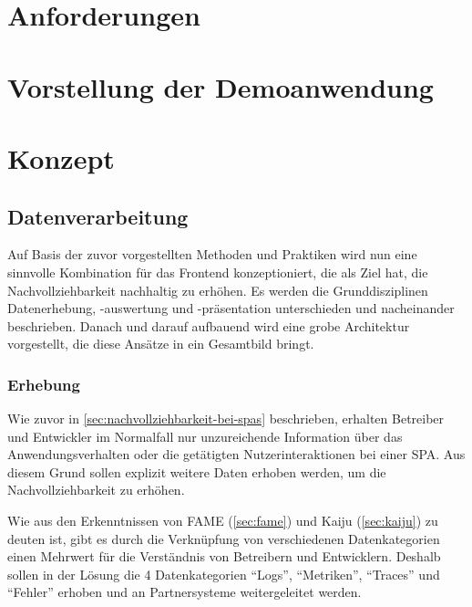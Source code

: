 	
\section{Anforderungen}

	
\section{Vorstellung der Demoanwendung}

	
\newpage
	
\section{Konzept}
	
	\subsection{Datenverarbeitung}

	Auf Basis der zuvor vorgestellten Methoden und Praktiken wird nun eine sinnvolle Kombination für das Frontend konzeptioniert, die als Ziel hat, die Nachvollziehbarkeit nachhaltig zu erhöhen. Es werden die Grunddisziplinen Datenerhebung, -auswertung und -präsentation unterschieden und nacheinander beschrieben. Danach und darauf aufbauend wird eine grobe Architektur vorgestellt, die diese Ansätze in ein Gesamtbild bringt.
		
	\subsubsection{Erhebung}
	
	Wie zuvor in \autoref{sec:nachvollziehbarkeit-bei-spas} beschrieben, erhalten Betreiber und Entwickler im Normalfall nur unzureichende Information über das Anwendungsverhalten oder die getätigten Nutzerinteraktionen bei einer SPA. Aus diesem Grund sollen explizit weitere Daten erhoben werden, um die Nachvollziehbarkeit zu erhöhen.
	
	Wie aus den Erkenntnissen von FAME (\autoref{sec:fame}) und Kaiju (\autoref{sec:kaiju}) zu deuten ist, gibt es durch die Verknüpfung von verschiedenen Datenkategorien einen Mehrwert für die Verständnis von Betreibern und Entwicklern. Deshalb sollen in der Lösung die 4 Datenkategorien \enquote{Logs}, \enquote{Metriken}, \enquote{Traces} und \enquote{Fehler} erhoben und an Partnersysteme weitergeleitet werden.
	
